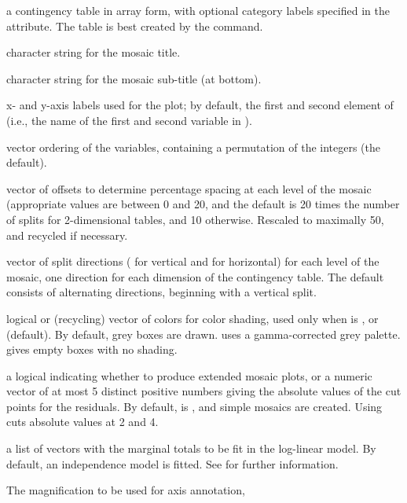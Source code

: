 \begin{Arguments}
\begin{ldescription}
\item[\code{x}] a contingency table in array form, with optional category
labels specified in the  attribute.  The table is
best created by the  command.
\item[\code{main}] character string for the mosaic title.
\item[\code{sub}] character string for the mosaic sub-title (at bottom).
\item[\code{xlab,ylab}] x- and y-axis labels used for the plot; by default,
the first and second element of  (i.e., the
name of the first and second variable in ).
\item[\code{sort}] vector ordering of the variables, containing a permutation
of the integers  (the default).
\item[\code{off}] vector of offsets to determine percentage spacing at each
level of the mosaic (appropriate values are between 0 and 20,
and the default is 20 times the number of splits for 2-dimensional
tables, and 10 otherwise.  Rescaled to maximally 50, and recycled if
necessary.
\item[\code{dir}] vector of split directions ( for vertical and
 for horizontal) for each level of the mosaic, one
direction for each dimension of the contingency table.  The
default consists of alternating directions, beginning with a
vertical split.
\item[\code{color}] logical or (recycling) vector of colors for color
shading, used only when  is , or 
(default).  By default, grey boxes are drawn.  
uses a gamma-corrected grey palette.   gives empty
boxes with no shading.
\item[\code{shade}] a logical indicating whether to produce extended mosaic
plots, or a numeric vector of at most 5 distinct positive numbers
giving the absolute values of the cut points for the residuals.  By
default,  is , and simple mosaics are
created.  Using  cuts absolute values at 2 and
4.
\item[\code{margin}] a list of vectors with the marginal totals to be fit in
the log-linear model.  By default, an independence model is fitted.
See  for further information.
\item[\code{cex.axis}] The magnification to be used for axis annotation,

\end{ldescription}
\end{Arguments}
